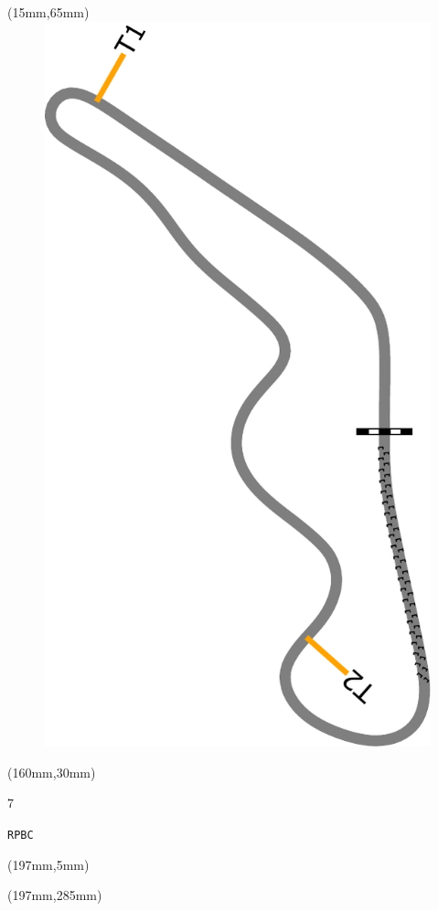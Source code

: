 \begin{textblock*}{185mm}(15mm,65mm)%
\centering
\mbox{\includegraphics[width=185mm,height=210mm,keepaspectratio]{PT/RPBC.pdf}}
\end{textblock*}
\begin{textblock*}{40mm}(160mm,30mm)%
\Large
\par{} 
\par7 
\par\hfill\tiny\tt RPBC\\
\end{textblock*}
\begin{textblock*}{20mm}(197mm,5mm)%
\fbox{\thepage}
\label{RPBC}
\end{textblock*}
\begin{textblock*}{20mm}(197mm,285mm)%
\fbox{\thepage}
\end{textblock*}

